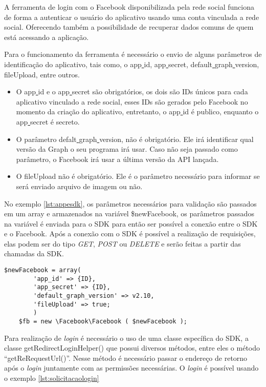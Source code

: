A ferramenta de login com o Facebook disponibilizada pela rede social funciona de forma a autenticar o usuário do aplicativo usando uma conta vinculada a rede social. Oferecendo também a possibilidade de recuperar dados comuns de quem está acessando a aplicação.

Para o funcionamento da ferramenta é necessário o envio de alguns parâmetros de identificação do aplicativo, tais como, o app\underline{{ }}id, app\underline{{ }}secret, default\underline{{ }}graph\underline{{ }}version, fileUpload, entre outros.

\begin{itemize}
\item O app\underline{{ }}id e o app\underline{{ }}secret são obrigatórios, os dois são IDs únicos para cada aplicativo vinculado a rede social, esses IDs são gerados pelo Facebook no momento da criação do aplicativo, entretanto, o app\underline{{ }}id é publico, enquanto o app\underline{{ }}secret é secreto.

\item O parâmetro defalt\underline{{ }}graph\underline{{ }}version, não é obrigatório. Ele irá identificar qual versão da Graph o seu programa irá usar. Caso não seja passado como parâmetro, o Facebook irá usar a última versão da API lançada.

\item O fileUpload não é obrigatório. Ele é o parâmetro necessário para informar se será enviado arquivo de imagem ou não.
\end{itemize}

No exemplo \ref{lst:appesdk}, os parâmetros necessários para validação são passados em um array e armazenados na variável \$newFacebook, os parâmetros passados na variável é enviada para o SDK para então ser possível a conexão entre o SDK e o Facebook. Após a conexão com o SDK é possível a realização de requisições, elas podem ser do tipo \textit{GET}, \textit{POST} ou \textit{DELETE} e serão feitas a partir das chamadas da SDK.

\begin{lstlisting}[caption={Conexão entre aplicativo e SDK},label={lst:appesdk}]
	$newFacebook = array(
		'app_id' => {ID},
		'app_secret' => {ID},
		'default_graph_version' => v2.10,
		'fileUpload' => true;
		)
	$fb = new \Facebook\Facebook ( $newFacebook );
\end{lstlisting}

Para realização de \textit{login} é necessário o uso de uma classe específica do SDK, a classe getRedirectLoginHelper() que possui diversos métodos, entre eles o método ``getReRequestUrl()''. Nesse método é necessário passar o endereço de retorno após o \textit{login} juntamente com as permissões necessárias. O \textit{login} é possível usando o exemplo \ref{lst:solicitacaologin}

